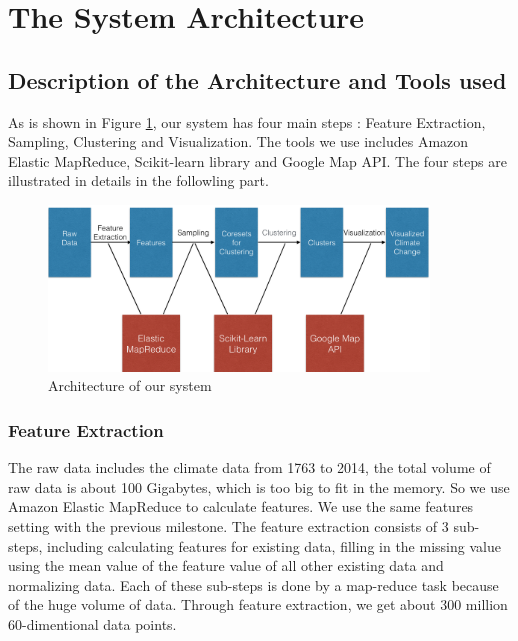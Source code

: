 \section{The System Architecture}

\subsection{Description of the Architecture and Tools used}
As is shown in Figure \ref{fig:archi}, our system has four main steps : Feature Extraction, Sampling, Clustering and Visualization. The tools we use includes Amazon Elastic MapReduce\cite{EMR}, Scikit-learn\cite{sklearn} library and Google Map API\cite{GoogleMap}. The four steps are illustrated in details in the followling part.
\begin{figure}[htbp]
				\centering
				\includegraphics[width=0.9\textwidth]{images/Architecture.png}
				\caption{Architecture of our system}
				\label{fig:archi}
 \end{figure}
 
\subsubsection{Feature Extraction}
The raw data includes the climate data from 1763 to 2014, the total volume of raw data is about 100 Gigabytes, which is too big to fit in the memory. So we use Amazon Elastic MapReduce to calculate features. We use the same features setting with the previous milestone. The feature extraction consists of 3 sub-steps, including calculating features for existing data, filling in the missing value using the mean value of the feature value of all other existing data and normalizing data. Each of these sub-steps is done by a map-reduce task because of the huge volume of data. Through feature extraction, we get about 300 million 60-dimentional data points.


